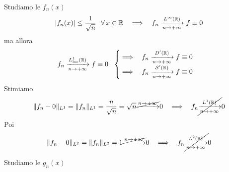 Studiamo le $f_{n}(x)$
\begin{equation*}
| f_{n}(x)| \leq \frac{1}{\sqrt{n}} \ \ \forall x\in \RR  \ \ \implies \ \ f_{n}\xrightarrow[n\rightarrow + \infty ]{L^{\infty }(\RR)} f\equiv 0
\end{equation*}
ma allora
\begin{equation*}
f_{n}\xrightarrow[n\rightarrow + \infty ]{L^{1}_{\operatorname{loc}}(\mathbb{R})} f\equiv 0\ \ \begin{cases}
\implies \ \ f_{n}\xrightarrow[n\rightarrow + \infty ]{D'(\mathbb{R})} f\equiv 0\\
\implies \ \ f_{n}\xrightarrow[n\rightarrow + \infty ]{\mathcal{S}  '(\mathbb{R})} f\equiv 0
\end{cases}
\end{equation*}
Stimiamo
\begin{equation*}
\Vert f_{n} - 0\Vert _{L^{1}} = \Vert f_{n}\Vert _{L^{1}} = \frac{n}{\sqrt{n}} = \sqrt{n}\cancel{\xrightarrow{n\rightarrow + \infty }} 0\ \ \implies \ \ f_{n}\cancel{\xrightarrow[n\rightarrow + \infty ]{L^{1}(\RR)}} 0
\end{equation*}
Poi
\begin{equation*}
\Vert f_{n} - 0\Vert _{L^{2}} = \Vert f_{n}\Vert _{L^{2}} = 1\cancel{\xrightarrow{n\rightarrow + \infty }} 0\ \ \implies \ \ f_{n}\cancel{\xrightarrow[n\rightarrow + \infty ]{L^{2}(\RR)}} 0
\end{equation*}


Studiamo le $g_{n}(x)$

